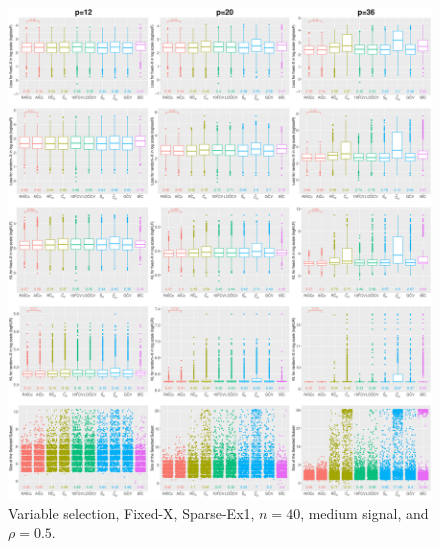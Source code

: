 \begin{figure}[!ht]
\centering
\includegraphics[width=\textwidth]{figures/supplement/fixedx/subset_selection/Sparse-Ex1_n40_msnr_rho05.eps}
\caption{Variable selection, Fixed-X, Sparse-Ex1, $n=40$, medium signal, and $\rho=0.5$.}
\end{figure}
\clearpage
